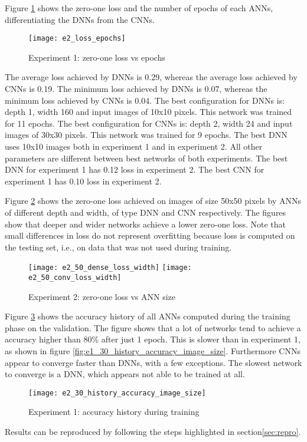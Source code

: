 Figure \ref{fig:e2_loss_epochs} shows the zero-one loss and the number of epochs of each ANNs, differentiating the DNNs from the CNNs.
\begin{figure}
\texttt{[image: e2\_loss\_epochs]}
\caption{Experiment 1: zero-one loss vs epochs}\label{fig:e2_loss_epochs}
\end{figure}
The average loss achieved by DNNs is 0.29, whereas the average loss achieved by CNNs is 0.19. The minimum loss achieved by DNNs is 0.07, whereas the minimum loss achieved by CNNs is 0.04. The best configuration for DNNs is: depth 1, width 160 and input images of 10x10 pixels. This network was trained for 11 epochs. The best configuration for CNNs is: depth 2, width 24 and input images of 30x30 pixels. This network was trained for 9 epochs. The best DNN uses 10x10 images both in experiment 1 and in experiment 2. All other parameters are different between best networks of both experiments. The best DNN for experiment 1 has 0.12 loss in experiment 2. The best CNN for experiment 1 has 0.10 loss in experiment 2.

Figure \ref{fig:e2_50_loss_width} shows the zero-one loss achieved on images of size 50x50 pixels by ANNs of different depth and width, of type DNN and CNN respectively. The figures show that deeper and wider networks achieve a lower zero-one loss. Note that small differences in loss do not represent overfitting because loss is computed on the testing set, i.e., on data that was not used during training.
\begin{figure}
\texttt{[image: e2\_50\_dense\_loss\_width]}
\texttt{[image: e2\_50\_conv\_loss\_width]}
\caption{Experiment 2: zero-one loss vs ANN size}\label{fig:e2_50_loss_width}
\end{figure}

Figure \ref{fig:e2_30_history_accuracy_image_size} shows the accuracy history of all ANNs computed during the training phase on the validation. The figure shows that a lot of networks tend to achieve a accuracy higher than 80\% after just 1 epoch. This is slower than in experiment 1, as shown in figure \ref{fig:e1_30_history_accuracy_image_size}. Furthermore CNNs appear to converge faster than DNNs, with a few exceptions. The slowest network to converge is a DNN, which appears not able to be trained at all.
\begin{figure}
\texttt{[image: e2\_30\_history\_accuracy\_image\_size]}
\caption{Experiment 1: accuracy history during training}\label{fig:e2_30_history_accuracy_image_size}
\end{figure}

Results can be reproduced by following the steps highlighted in section\ref{sec:repro}.
